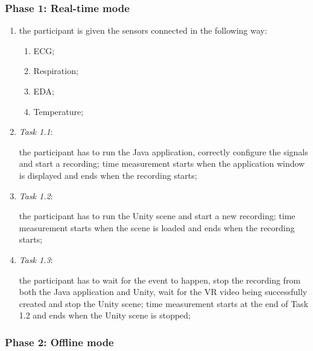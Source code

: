 \documentclass[binding=0.6cm,LaM]{sapthesis}
\begin{document}
\subsubsection{Phase 1: Real-time mode}    

\begin{enumerate}

\item the participant is given the sensors connected in the following way:

\begin{enumerate}
\item ECG;
\item Respiration;
\item EDA;
\item Temperature;
\end{enumerate}

\item \textit{Task 1.1}: 

the participant has to run the Java application, correctly configure the signals and start a recording; time measurement starts when the application window is displayed and ends when the recording starts;

\item \textit{Task 1.2}: 

the participant has to run the Unity scene and start a new recording; time measurement starts when the scene is loaded and ends when the recording starts;

\item \textit{Task 1.3}: 

the participant has to wait for the event to happen, stop the recording from both the Java application and Unity, wait for the VR video being successfully created and stop the Unity scene; time measurement starts at the end of Task 1.2 and ends when the Unity scene is stopped;

\end{enumerate}

\subsubsection{Phase 2: Offline mode}    
\end{document}
